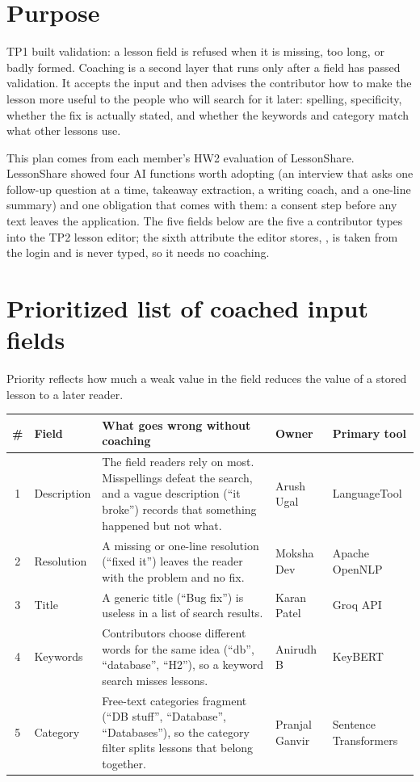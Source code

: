 \documentclass[11pt]{article}
\begin{document}

\section*{Purpose}
TP1 built validation: a lesson field is refused when it is missing, too long, or badly formed.
Coaching is a second layer that runs only after a field has passed validation. It accepts the
input and then advises the contributor how to make the lesson more useful to the people who will
search for it later: spelling, specificity, whether the fix is actually stated, and whether the
keywords and category match what other lessons use.

This plan comes from each member's HW2 evaluation of LessonShare. LessonShare showed four AI
functions worth adopting (an interview that asks one follow-up question at a time, takeaway
extraction, a writing coach, and a one-line summary) and one obligation that comes with them: a
consent step before any text leaves the application. The five fields below are the five a
contributor types into the TP2 lesson editor; the sixth attribute the editor stores,
, is taken from the login and is never typed, so it needs no coaching.

\section*{Prioritized list of coached input fields}
Priority reflects how much a weak value in the field reduces the value of a stored lesson to a
later reader.

\begin{tabularx}{\linewidth}{@{}c l X l l@{}}
\toprule
\textbf{\#} & \textbf{Field} & \textbf{What goes wrong without coaching} & \textbf{Owner} & \textbf{Primary tool} \\
\midrule
1 & Description & The field readers rely on most. Misspellings defeat the search, and a vague
  description (``it broke'') records that something happened but not what. & Arush Ugal & LanguageTool \\
2 & Resolution & A missing or one-line resolution (``fixed it'') leaves the reader with the
  problem and no fix. & Moksha Dev & Apache OpenNLP \\
3 & Title & A generic title (``Bug fix'') is useless in a list of search results. & Karan Patel & Groq API \\
4 & Keywords & Contributors choose different words for the same idea (``db'', ``database'',
  ``H2''), so a keyword search misses lessons. & Anirudh B & KeyBERT \\
5 & Category & Free-text categories fragment (``DB stuff'', ``Database'', ``Databases''), so the
  category filter splits lessons that belong together. & Pranjal Ganvir & Sentence Transformers \\
\bottomrule
\end{tabularx}
\end{document}
